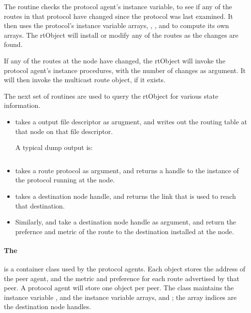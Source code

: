 \begin{itemize}
The routine checks the protocol agent's instance variable,
 to see if any of the routes in that protocol
have changed since the protocol was last examined.
It then uses the protocol's instance variable arrays,
, , and 
to compute its own arrays.
The rtObject will install or modify any of the routes as the changes are found.

If any of the routes at the node have changed,
the rtObject will invoke the protocol agent's instance procedures,
 with the number of changes as argument.
It will then invoke the multicast route object, if it exists.
\end{itemize}

The next set of routines are used to query the rtObject for various state
information.
\begin{itemize}
\item
{}
takes a output file descriptor as arugment, and writes out the
routing table at that node on that file descriptor.

A typical dump output is:
{\small
\begin{verbatim}
\end{verbatim}
}

\item
{}
takes a route protocol as argument, and returns a handle to the instance
of the protocol running at the  node.

\item
{}
takes a destination node handle, and returns the link that is used to reach
that destination.

\item
Similarly,
 and
take a destination node handle as argument, and return the prefernce
and metric of the route to the destination installed at the node.
\end{itemize}

\paragraph{The }
is a container class used by the protocol agents.
Each object stores the address of the peer agent, and the 
metric and preference for each route advertised by that peer.
A protocol agent will store one object per peer.
The class maintains the instance variable , and the
instance variable arrays,  and ;
the array indices are the destination node handles.

